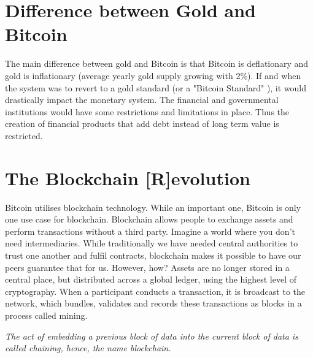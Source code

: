 \section*{Difference between Gold and Bitcoin}
The main difference between gold and Bitcoin is that Bitcoin is deflationary and gold is inflationary (average yearly gold supply growing with 2\%). If and when the system was to revert to a gold standard (or a "Bitcoin Standard" \parencite{bitcoinstandard}), it would drastically impact the monetary system. The financial and governmental institutions would have some restrictions and limitations in place. Thus the creation of financial products that add debt instead of long term value is restricted.


\section{The Blockchain [R]evolution}
Bitcoin utilises blockchain technology. While an important one, Bitcoin is only one use case for blockchain. Blockchain allows people to exchange assets and perform transactions without a third party. Imagine a world where you don't need intermediaries. While traditionally we have needed central authorities to trust one another and fulfil contracts, blockchain makes it possible to have our peers guarantee that for us. However, how?
Assets are no longer stored in a central place, but distributed across a global ledger, using the highest level of cryptography. When a participant conducts a transaction, it is broadcast to the network, which bundles, validates and records these transactions as blocks in a process called mining.

\medskip 
{}
    \begin{tcolorbox}
    [enhanced,
    title=Blockchain?,
    frame style=
    {left color=orange!85!black,right color=yellow!95!black}]
        
           \textit{The act of embedding a previous block of data into the current block of data is called chaining, hence, the name blockchain.}
       
\end{tcolorbox}
\medskip


